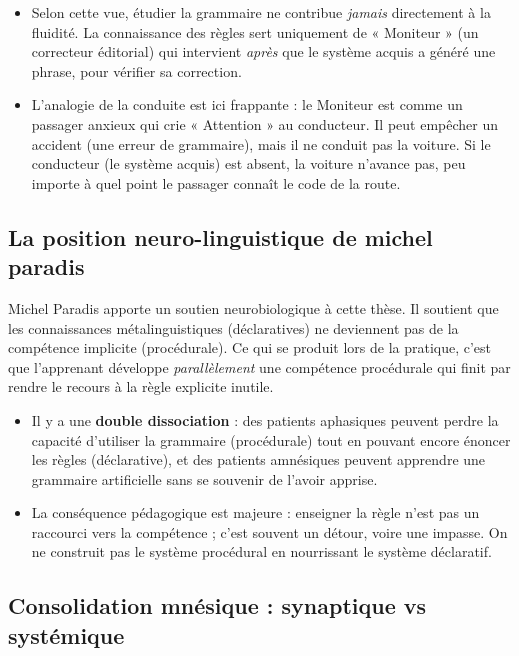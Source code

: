 \begin{itemize}\item Selon cette vue, étudier la grammaire ne contribue \textit{jamais} directement à la fluidité. La connaissance des règles sert uniquement de « Moniteur » (un correcteur éditorial) qui intervient \textit{après} que le système acquis a généré une phrase, pour vérifier sa correction.\item L'analogie de la conduite est ici frappante : le Moniteur est comme un passager anxieux qui crie « Attention\! » au conducteur. Il peut empêcher un accident (une erreur de grammaire), mais il ne conduit pas la voiture. Si le conducteur (le système acquis) est absent, la voiture n'avance pas, peu importe à quel point le passager connaît le code de la route.\cite{III-3-3-ref24}\end{itemize}

\subsection{La position neuro-linguistique de michel paradis}

Michel Paradis apporte un soutien neurobiologique à cette thèse. Il soutient que les connaissances
métalinguistiques (déclaratives) ne deviennent pas de la compétence implicite (procédurale). Ce qui
se produit lors de la pratique, c'est que l'apprenant développe \textit{parallèlement} une
compétence procédurale qui finit par rendre le recours à la règle explicite
inutile.\cite{III-3-3-ref27}

\begin{itemize}\item Il y a une \textbf{double dissociation} : des patients aphasiques peuvent perdre la capacité d'utiliser la grammaire (procédurale) tout en pouvant encore énoncer les règles (déclarative), et des patients amnésiques peuvent apprendre une grammaire artificielle sans se souvenir de l'avoir apprise.\item La conséquence pédagogique est majeure : enseigner la règle n'est pas un raccourci vers la compétence ; c'est souvent un détour, voire une impasse. On ne construit pas le système procédural en nourrissant le système déclaratif.\cite{III-3-3-ref30}\end{itemize}

\subsection{Consolidation mnésique : synaptique vs systémique}

